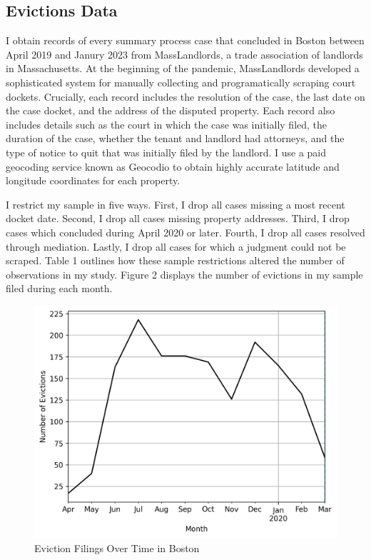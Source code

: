 \documentclass[12pt]{article}
\begin{document}
    \subsection{Evictions Data}
    I obtain records of every summary process case that concluded in Boston between April 2019 and Janury 2023 from MassLandlords, a trade association of landlords in Massachusetts. At the beginning of the pandemic, MassLandlords developed a sophisticated system for manually collecting and programatically scraping court dockets. Crucially, each record includes the resolution of the case, the last date on the case docket, and the address of the disputed property. Each record also includes details such as the court in which the case was initially filed, the duration of the case, whether the tenant and landlord had attorneys, and the type of notice to quit that was initially filed by the landlord. I use a paid geocoding service known as Geocodio to obtain highly accurate latitude and longitude coordinates for each property. 

    I restrict my sample in five ways. First, I drop all cases missing a most recent docket date. Second, I drop all cases missing property addresses. Third, I drop cases which concluded during April 2020 or later. Fourth, I drop all cases resolved through mediation. Lastly, I drop all cases for which a judgment could not be scraped. Table 1 outlines how these sample restrictions altered the number of observations in my study. Figure 2 displays the number of evictions in my sample filed during each month. 


        \begin{figure}[H]
            \centering
            \includegraphics{output/summary_statistics/figures/filings_over_time.png}
            \caption{Eviction Filings Over Time in Boston}
            \label{fig:my_label}
        \end{figure}
\end{document}
